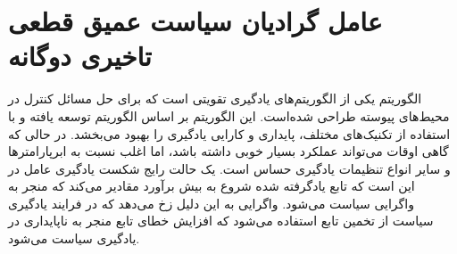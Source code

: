 \section{عامل گرادیان سیاست عمیق قطعی تاخیری دوگانه}
الگوریتم
 یکی از الگوریتم‌های یادگیری تقویتی است که برای حل مسائل کنترل در محیط‌های پیوسته طراحی شده‌است. این الگوریتم بر اساس الگوریتم  توسعه یافته و با استفاده از تکنیک‌های مختلف، پایداری و کارایی یادگیری را بهبود می‌بخشد.
 در حالی که  گاهی اوقات می‌تواند عملکرد بسیار خوبی داشته باشد، اما اغلب نسبت به ابرپارامترها و سایر انواع تنظیمات یادگیری حساس است.
  یک حالت رایج شکست یادگیری عامل در  این است که تابع  یادگرفته شده شروع به بیش برآورد مقادیر  می‌کند که منجر به واگرایی سیاست می‌شود. واگرایی به این دلیل زخ می‌دهد که در فرایند یادگیری سیاست از تخمین تابع 
 استفاده می‌شود که افزایش خطای تابع  منجر به ناپایداری در یادگیری سیاست می‌شود.
 

